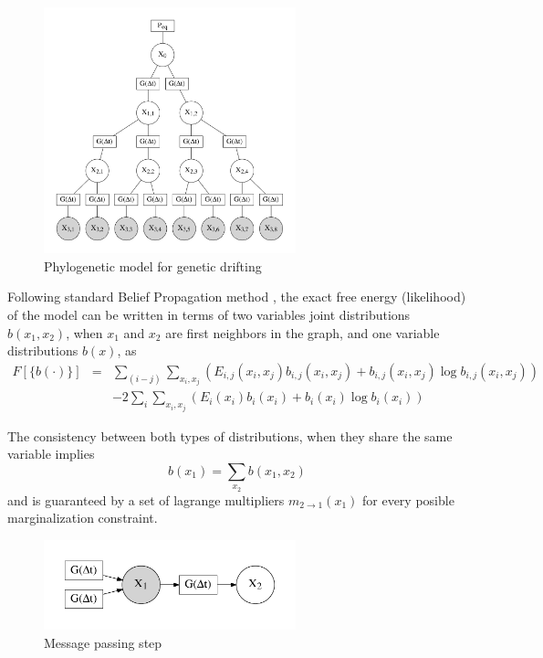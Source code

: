 \documentclass[10pt]{article}
\begin{document}
\begin{figure}[!htb]
\begin{center}
\includegraphics[width=0.65\textwidth]{Images/factgraph.pdf}
\end{center}
\caption{ Phylogenetic model for genetic drifting \label{fig:factgraph}}
\end{figure}

Following standard Belief Propagation method \cite{}, the exact free energy (likelihood) of the model can be written in terms of two variables joint distributions $b(x_1,x_2)$, when $x_1$ and $x_2$ are first neighbors in the graph, and one variable distributions $b(x)$, as 
\begin{eqnarray*} 
F[\{b(\cdot) \}] &=& \sum_{(i-j)}  \sum_{x_i,x_j} \displaystyle\left( E_{i,j}(x_i,x_j) b_{i,j}(x_i,x_j) + b_{i,j}(x_i,x_j) \log b_{i,j}(x_i,x_j) \right)  \\
&& -2 \sum_{i}   \sum_{x_i,x_j} \left( E_{i}(x_i) b_{i}(x_i) + b_{i}(x_i) \log b_{i}(x_i) \right)
\end{eqnarray*}

The consistency between both types of distributions, when they share the same variable implies 
\[ b(x_1) = \sum_{x_2} b(x_1, x_2)
\]
and is guaranteed by a set of lagrange multipliers $m_{2 \to 1}(x_1)$ for every posible marginalization constraint.

\begin{figure}[!htb]
\begin{center}
\includegraphics[width=0.65\textwidth]{Images/mess.pdf}
\end{center}
\caption{Message passing step \label{fig:mess}}
\end{figure}
\end{document}
